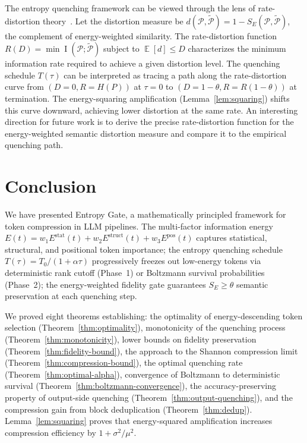 \documentclass[11pt]{article}
\theoremstyle{remark}
\DeclareMathOperator{\E}{\mathbb{E}}
\DeclareMathOperator{\MI}{I}
\newcommand{\Es}{E^{\text{stat}}}
\newcommand{\Er}{E^{\text{struct}}}
\newcommand{\Ep}{E^{\text{pos}}}
\begin{document}
The entropy quenching framework can be viewed through the lens of
rate-distortion theory~\cite{berger1971,cover2006}. Let the distortion
measure be $d(\mathcal{P}, \tilde{\mathcal{P}}) = 1 - S_E(\mathcal{P},
\tilde{\mathcal{P}})$, the complement of energy-weighted similarity.
The rate-distortion function $R(D) = \min \MI(\mathcal{P}; \tilde{\mathcal{P}})$
subject to $\E[d] \leq D$ characterizes the minimum information rate
required to achieve a given distortion level. The quenching schedule
$T(\tau)$ can be interpreted as tracing a path along the rate-distortion
curve from $(D=0, R=H(P))$ at $\tau = 0$ to $(D=1-\theta, R=R(1-\theta))$
at termination. The energy-squaring amplification
(Lemma~\ref{lem:squaring}) shifts this curve downward, achieving lower
distortion at the same rate. An interesting direction for future work
is to derive the precise rate-distortion function for the energy-weighted
semantic distortion measure and compare it to the empirical quenching path.

\section{Conclusion}
\label{sec:conclusion}

We have presented Entropy Gate, a mathematically principled framework for
token compression in LLM pipelines. The multi-factor information energy
$E(t) = w_1\Es(t) + w_2\Er(t) + w_3\Ep(t)$ captures statistical,
structural, and positional token importance; the entropy quenching schedule
$T(\tau) = T_0/(1 + \alpha\tau)$ progressively freezes out low-energy
tokens via deterministic rank cutoff (Phase~1) or Boltzmann survival
probabilities (Phase~2); the energy-weighted fidelity gate guarantees
$S_E \geq \theta$ semantic preservation at each quenching step.

We proved eight theorems establishing: the optimality of energy-descending
token selection (Theorem~\ref{thm:optimality}), monotonicity of the
quenching process (Theorem~\ref{thm:monotonicity}), lower bounds on fidelity
preservation (Theorem~\ref{thm:fidelity-bound}), the approach to the
Shannon compression limit (Theorem~\ref{thm:compression-bound}), the
optimal quenching rate (Theorem~\ref{thm:optimal-alpha}), convergence of
Boltzmann to deterministic survival (Theorem~\ref{thm:boltzmann-convergence}),
the accuracy-preserving property of output-side quenching
(Theorem~\ref{thm:output-quenching}), and the compression gain from block
deduplication (Theorem~\ref{thm:dedup}). Lemma~\ref{lem:squaring} proves
that energy-squared amplification increases compression efficiency by
$1 + \sigma^2/\mu^2$.
\end{document}
